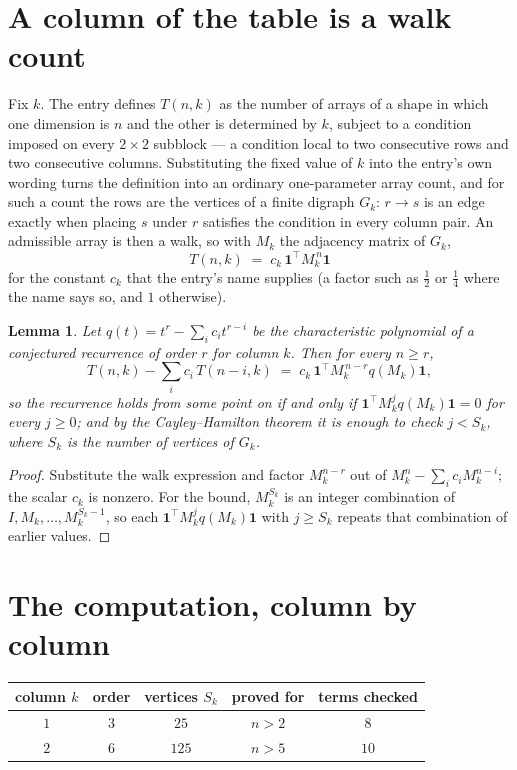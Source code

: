 \documentclass[11pt,a4paper]{article}
\theoremstyle{plain}
\newtheorem{lemma}[theorem]{Lemma}
\theoremstyle{definition}
\begin{document}
\section{A column of the table is a walk count}

Fix $k$. The entry defines $T(n,k)$ as the number of arrays of a shape in which one dimension
is $n$ and the other is determined by $k$, subject to a condition imposed on every
$2\times2$ subblock --- a condition local to two consecutive rows and two consecutive columns.
Substituting the fixed value of $k$ into the entry's own wording turns the definition into an
ordinary one-parameter array count, and for such a count the rows are the vertices of a finite
digraph $G_k$: $r\to s$ is an edge exactly when placing $s$ under $r$ satisfies the condition
in every column pair. An admissible array is then a walk, so with $M_k$ the adjacency matrix
of $G_k$,
\[
T(n,k)\;=\;c_k\,\mathbf{1}^{\!\top}M_k^{\,n}\mathbf{1}
\]
for the constant $c_k$ that the entry's name supplies (a factor such as $\tfrac12$ or
$\tfrac14$ where the name says so, and $1$ otherwise).

\begin{lemma}\label{lem:crit}
Let $q(t)=t^{r}-\sum_i c_it^{r-i}$ be the characteristic polynomial of a conjectured
recurrence of order $r$ for column $k$. Then for every $n\ge r$,
\[
T(n,k)-\sum_i c_i\,T(n-i,k)\;=\;c_k\,\mathbf{1}^{\!\top}M_k^{\,n-r}q(M_k)\mathbf{1},
\]
so the recurrence holds from some point on if and only if
$\mathbf{1}^{\!\top}M_k^{j}q(M_k)\mathbf{1}=0$ for every $j\ge0$; and by the
Cayley--Hamilton theorem it is enough to check $j<S_k$, where $S_k$ is the number of vertices
of $G_k$.
\end{lemma}

\begin{proof}
Substitute the walk expression and factor $M_k^{n-r}$ out of $M_k^{n}-\sum_ic_iM_k^{n-i}$;
the scalar $c_k$ is nonzero. For the bound, $M_k^{S_k}$ is an integer combination of
$I,M_k,\dots,M_k^{S_k-1}$, so each $\mathbf{1}^{\!\top}M_k^{j}q(M_k)\mathbf{1}$ with
$j\ge S_k$ repeats that combination of earlier values.
\end{proof}

\section{The computation, column by column}

\begin{center}
\begin{tabular}{ccccc}
column $k$ & order & vertices $S_k$ & proved for & terms checked \\ \hline
$1$ & $3$ & $25$ & $n>2$ & $8$ \\
$2$ & $6$ & $125$ & $n>5$ & $10$ \\
\end{tabular}
\end{center}
\end{document}
